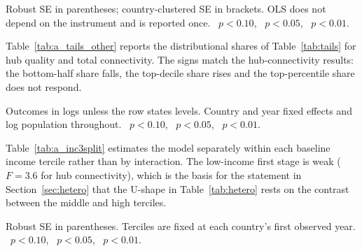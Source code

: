 \begin{table}[H]\centering\caption{Absolute redistribution (market minus disposable Gini, points) as an outcome.}\label{tab:a_absred}
\begin{threeparttable}\small
\begin{tablenotes}\footnotesize\item Robust SE in parentheses; country-clustered SE in brackets. OLS does not depend on the instrument and is reported once. \sym{*}~$p<0.10$, \sym{**}~$p<0.05$, \sym{***}~$p<0.01$.\end{tablenotes}\end{threeparttable}\end{table}

Table~\ref{tab:a_tails_other} reports the distributional shares of Table~\ref{tab:tails} for hub quality and total connectivity. The signs match the hub-connectivity results: the bottom-half share falls, the top-decile share rises and the top-percentile share does not respond.

\begin{table}[H]\centering\caption{Distributional location for hub quality and total connectivity (Feyrer instrument).}\label{tab:a_tails_other}
\begin{threeparttable}\small
\begin{tablenotes}\footnotesize\item Outcomes in logs unless the row states levels. Country and year fixed effects and log population throughout. \sym{*}~$p<0.10$, \sym{**}~$p<0.05$, \sym{***}~$p<0.01$.\end{tablenotes}\end{threeparttable}\end{table}

Table~\ref{tab:a_inc3split} estimates the model separately within each baseline income tercile rather than by interaction. The low-income first stage is weak ($F=3.6$ for hub connectivity), which is the basis for the statement in Section~\ref{sec:hetero} that the U-shape in Table~\ref{tab:hetero} rests on the contrast between the middle and high terciles.

\begin{table}[H]\centering\caption{Separate 2SLS within baseline income terciles (Feyrer instrument).}\label{tab:a_inc3split}
\begin{threeparttable}\small
\begin{tablenotes}\footnotesize\item Robust SE in parentheses. Terciles are fixed at each country's first observed year. \sym{*}~$p<0.10$, \sym{**}~$p<0.05$, \sym{***}~$p<0.01$.\end{tablenotes}\end{threeparttable}\end{table}

